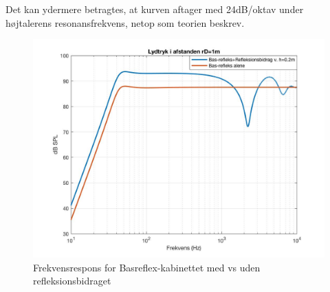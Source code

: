Det kan ydermere betragtes, at kurven aftager med 24dB/oktav under højtalerens resonansfrekvens, netop som teorien beskrev.\cite{Elektroakustik}

\begin{figure}[h!]
	\centering
	\includegraphics[width=\textwidth]{Pics/sim_samletrespons}
	\caption{Frekvensrespons for Basreflex-kabinettet med vs uden refleksionsbidraget} 
	\label{fig:sim_samletrespons}
\end{figure}
